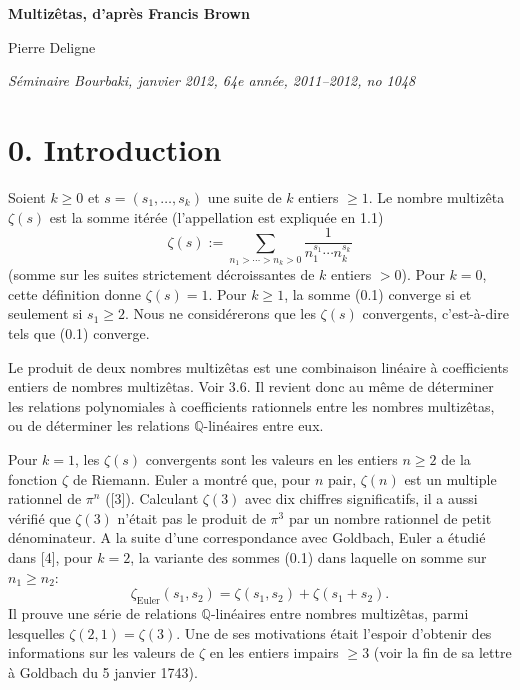 \documentclass[10pt]{article}
\newcommand{\Q}{\mathbb Q}
\begin{document}
\begin{center}
{\Large\bfseries Multizêtas, d'après Francis Brown}\par
\vspace{0.35em}
Pierre Deligne\par
\vspace{0.35em}
{\itshape Séminaire Bourbaki, janvier 2012, 64e année, 2011--2012, no 1048}
\end{center}

\section*{0. Introduction}
Soient $k\geq 0$ et $s=(s_1,\ldots,s_k)$ une suite de $k$ entiers $\geq1$. Le nombre multizêta $\zeta(s)$ est la somme itérée (l'appellation est expliquée en 1.1)
\begin{equation}
\zeta(s):=\sum_{n_1>\cdots>n_k>0}\frac{1}{n_1^{s_1}\cdots n_k^{s_k}}
\tag{0.1}
\end{equation}
(somme sur les suites strictement décroissantes de $k$ entiers $>0$). Pour $k=0$, cette définition donne $\zeta(s)=1$. Pour $k\geq1$, la somme (0.1) converge si et seulement si $s_1\geq2$. Nous ne considérerons que les $\zeta(s)$ convergents, c'est-à-dire tels que (0.1) converge.

Le produit de deux nombres multizêtas est une combinaison linéaire à coefficients entiers de nombres multizêtas. Voir 3.6. Il revient donc au même de déterminer les relations polynomiales à coefficients rationnels entre les nombres multizêtas, ou de déterminer les relations $\Q$-linéaires entre eux.

Pour $k=1$, les $\zeta(s)$ convergents sont les valeurs en les entiers $n\geq2$ de la fonction $\zeta$ de Riemann. Euler a montré que, pour $n$ pair, $\zeta(n)$ est un multiple rationnel de $\pi^n$ ([3]). Calculant $\zeta(3)$ avec dix chiffres significatifs, il a aussi vérifié que $\zeta(3)$ n'était pas le produit de $\pi^3$ par un nombre rationnel de petit dénominateur. A la suite d'une correspondance avec Goldbach, Euler a étudié dans [4], pour $k=2$, la variante des sommes (0.1) dans laquelle on somme sur $n_1\geq n_2$:
\[
 \zeta_{\mathrm{Euler}}(s_1,s_2)=\zeta(s_1,s_2)+\zeta(s_1+s_2).
\]
Il prouve une série de relations $\Q$-linéaires entre nombres multizêtas, parmi lesquelles $\zeta(2,1)=\zeta(3)$. Une de ses motivations était l'espoir d'obtenir des informations sur les valeurs de $\zeta$ en les entiers impairs $\geq3$ (voir la fin de sa lettre à Goldbach du 5 janvier 1743).
\end{document}
